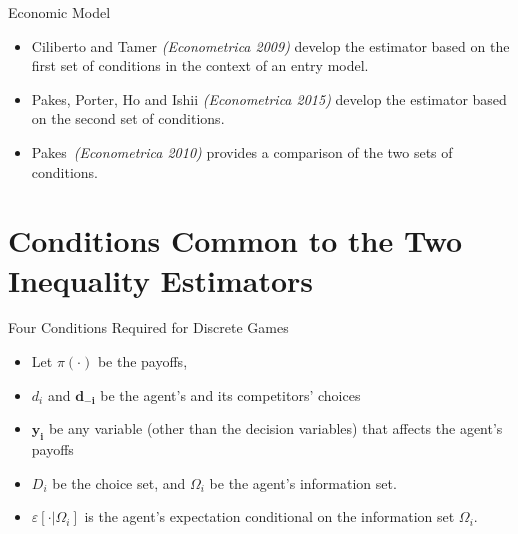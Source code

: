 \documentclass[aspectratio=169,11pt]{beamer}
\begin{document}
\begin{frame}{Economic Model}
\begin{itemize}
\item  Ciliberto and Tamer \textit{(Econometrica 2009)} develop the estimator based on the first set of conditions in the context of an entry model.\\
\vspace{0.1in}
\item Pakes, Porter, Ho and Ishii \textit{(Econometrica 2015)} develop the estimator based on the second set of conditions.\\
\vspace{0.1in}
\item  Pakes\ \textit{(Econometrica 2010)} provides a comparison of the two sets of conditions.\\
\end{itemize}
\end{frame}

\section{Conditions Common to the Two Inequality Estimators}

\begin{frame}{Four Conditions Required for Discrete Games}
\begin{itemize}
\item Let $\pi(\cdot)$ be the payoffs, 
\item $d_i$ and $\symbf{d_{-i}}$ be the agent's and its competitors' choices
\item $\symbf{y_i}$ be any variable (other than the decision variables) that affects the agent's payoffs
\item $D_i$ be the choice set, and $\Omega_i$ be the agent's information set.  
\item \large{$\varepsilon[ \cdot | \Omega_i]$} \normalsize is the agent's expectation conditional on the information set $\Omega_i$.
\end{itemize}
\end{frame}

\end{document}
